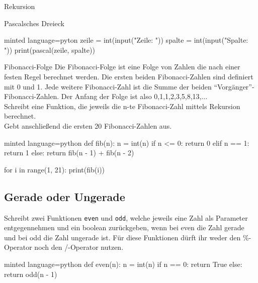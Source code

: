 \begin{task}[points=auto]{Rekursion}
\begin{subtask*}[points=0]{Pascalsches Dreieck }
\begin{solution}
\begin{codeBlock}[]{minted language=pyton}
                zeile = int(input("Zeile: "))
                spalte = int(input("Spalte: "))
                print(pascal(zeile, spalte))
            \end{codeBlock}
        \end{solution}
    \end{subtask*}
    \begin{subtask*}[points=0]{Fibonacci-Folge }
        Die Fibonacci-Folge ist eine Folge von Zahlen die nach einer festen Regel berechnet werden.
        Die ersten beiden Fibonacci-Zahlen sind definiert mit 0 und 1. Jede weitere Fibonacci-Zahl
        ist die Summe der beiden "`Vorgänger"'-Fibonacci-Zahlen. Der Anfang der Folge ist also 0,1,1,2,3,5,8,13,...\\
        Schreibt eine Funktion, die jeweils die n-te Fibonacci-Zahl mittels Rekursion berechnet.\\
        Gebt anschließend die ersten 20 Fibonacci-Zahlen aus.

        \begin{solution}
            \begin{codeBlock}[]{minted language=python}
                def fib(n):
                    n = int(n)
                    if n <= 0:
                        return 0
                    elif n == 1:
                        return 1
                    else:
                        return fib(n - 1) + fib(n - 2)


                for i in range(1, 21):
                    print(fib(i))
            \end{codeBlock}
        \end{solution}
    \end{subtask*}
    \begin{subtask*}[points=0]{}
        \subsection{Gerade oder Ungerade }
        Schreibt zwei Funktionen \texttt{even} und \texttt{odd}, welche jeweils eine Zahl
        als Parameter entgegennehmen und ein boolean zurückgeben, wenn bei even die Zahl
        gerade und bei odd die Zahl ungerade ist. Für diese Funktionen dürft ihr weder den \%-Operator noch den /-Operator nutzen.

        \begin{solution}
            \begin{codeBlock}[]{minted language=python}
                def even(n):
                    n = int(n)
                    if n == 0:
                        return True
                    else:
                        return odd(n - 1)



\end{codeBlock}
\end{solution}
\end{subtask*}
\end{task}
